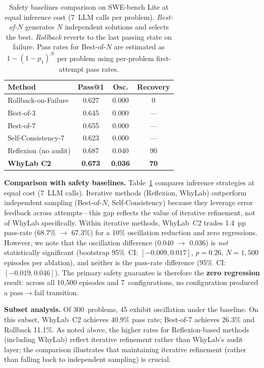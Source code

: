 \documentclass{article}
\begin{document}
\begin{table}[t]
  \centering
  \caption{Safety baselines comparison on SWE-bench Lite at equal
    inference cost (7~LLM calls per problem).
    \emph{Best-of-$N$} generates $N$ independent solutions and selects
    the best. \emph{Rollback} reverts to the last passing state on failure.
    Pass rates for Best-of-$N$ are estimated as $1-(1-p_1)^N$ per problem
    using per-problem first-attempt pass rates.}
  \label{tab:e5-baselines}
  \small
  \begin{tabular}{lccc}
    \toprule
    Method & Pass@1 & Osc. & Recovery \\
    \midrule
    Rollback-on-Failure   & 0.627 & 0.000 & 0    \\
    Best-of-3             & 0.645 & 0.000 & ---  \\
    Best-of-7             & 0.655 & 0.000 & ---  \\
    Self-Consistency-7    & 0.623 & 0.000 & ---  \\
    \midrule
    Reflexion (no audit)  & 0.687 & 0.040 & 90   \\
    \textbf{WhyLab C2}    & \textbf{0.673} & \textbf{0.036} & \textbf{70} \\
    \bottomrule
  \end{tabular}
\end{table}

\textbf{Comparison with safety baselines.}
Table~\ref{tab:e5-baselines} compares inference strategies at equal
cost (7~LLM calls). Iterative methods (Reflexion, WhyLab) outperform
independent sampling (Best-of-$N$, Self-Consistency) because they
leverage error feedback across attempts---this gap reflects the value
of iterative refinement, not of WhyLab specifically.
Within iterative methods, WhyLab~C2 trades 1.4~pp pass-rate
(68.7\% $\to$ 67.3\%) for a 10\% oscillation reduction
and zero regressions. However, we note that the oscillation
difference (0.040 $\to$ 0.036) is \emph{not} statistically significant
(bootstrap 95\%~CI: $[-0.009, 0.017]$, $p{=}0.26$, $N{=}1{,}500$
episodes per ablation), and neither is the pass-rate difference
(95\%~CI: $[-0.019, 0.046]$).
The primary safety guarantee is therefore the \textbf{zero regression}
result: across all 10{,}500 episodes and 7~configurations, no
configuration produced a pass$\to$fail transition.

\textbf{Subset analysis.}
Of 300~problems, 45 exhibit oscillation under the baseline.
On this subset, WhyLab~C2 achieves 40.9\% pass rate;
Best-of-7 achieves 26.3\% and Rollback 11.1\%.
As noted above, the higher rates for Reflexion-based methods (including
WhyLab) reflect iterative refinement rather than WhyLab's audit layer;
the comparison illustrates that maintaining iterative refinement
(rather than falling back to independent sampling) is crucial.
\end{document}
